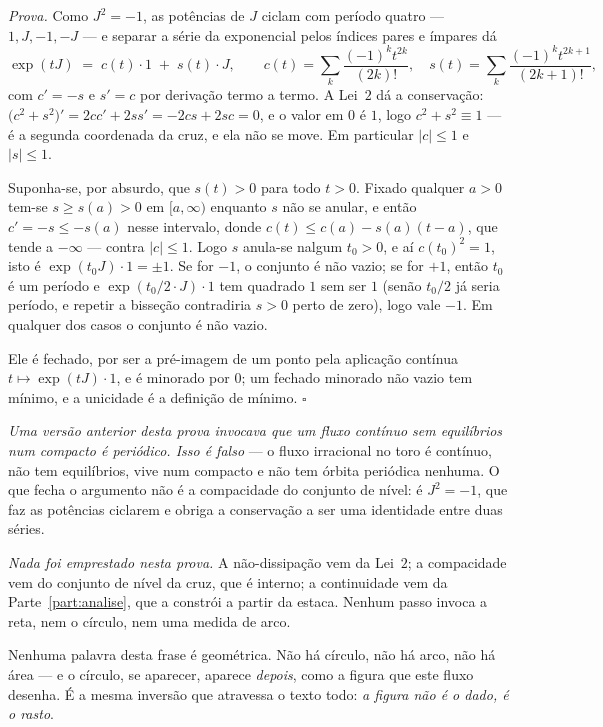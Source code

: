 \documentclass[livro.tex]{subfiles}
\begin{document}
\begin{mdframed}[linewidth=0.4pt,innerleftmargin=10pt,innerrightmargin=10pt,
                 innertopmargin=8pt,innerbottommargin=8pt,skipabove=6pt,skipbelow=6pt]
\smallskip
\emph{Prova.} Como $J^{2}=-1$, as potências de $J$ ciclam com período quatro --- $1,J,-1,-J$ ---
e separar a série da exponencial pelos índices pares e ímpares dá
\[
  \exp(tJ) \;=\; c(t)\cdot 1 \;+\; s(t)\cdot J,
  \qquad c(t)=\sum_{k}\frac{(-1)^{k}t^{2k}}{(2k)!},\quad
         s(t)=\sum_{k}\frac{(-1)^{k}t^{2k+1}}{(2k+1)!},
\]
com $c'=-s$ e $s'=c$ por derivação termo a termo. A Lei~$2$ dá a conservação: $\bigl(c^{2}+
s^{2}\bigr)'=2cc'+2ss'=-2cs+2sc=0$, e o valor em $0$ é $1$, logo $c^{2}+s^{2}\equiv1$ --- é a
segunda coordenada da cruz, e ela não se move. Em particular $|c|\leq1$ e $|s|\leq1$.

\smallskip
Suponha-se, por absurdo, que $s(t)>0$ para todo $t>0$. Fixado qualquer $a>0$ tem-se $s\geq s(a)>0$
em $[a,\infty)$ enquanto $s$ não se anular, e então $c'=-s\leq-s(a)$ nesse intervalo, donde
$c(t)\leq c(a)-s(a)(t-a)$, que tende a $-\infty$ --- contra $|c|\leq1$. Logo $s$ anula-se nalgum
$t_{0}>0$, e aí $c(t_{0})^{2}=1$, isto é $\exp(t_{0}J)\cdot1=\pm1$. Se for $-1$, o conjunto é não
vazio; se for $+1$, então $t_{0}$ é um período e $\exp(t_{0}/2\cdot J)\cdot1$ tem quadrado $1$ sem
ser $1$ (senão $t_{0}/2$ já seria período, e repetir a bisseção contradiria $s>0$ perto de zero),
logo vale $-1$. Em qualquer dos casos o conjunto é não vazio.

\smallskip
Ele é fechado, por ser a pré-imagem de um ponto pela aplicação contínua $t\mapsto\exp(tJ)\cdot1$,
e é minorado por $0$; um fechado minorado não vazio tem mínimo, e a unicidade é a definição de
mínimo. $\square$

\smallskip
\emph{Uma versão anterior desta prova invocava que um fluxo contínuo sem equilíbrios num compacto
é periódico. Isso é falso} --- o fluxo irracional no toro é contínuo, não tem equilíbrios, vive
num compacto e não tem órbita periódica nenhuma. O que fecha o argumento não é a compacidade do
conjunto de nível: é $J^{2}=-1$, que faz as potências ciclarem e obriga a conservação a ser uma
identidade entre duas séries.

\smallskip
\emph{Nada foi emprestado nesta prova.} A não-dissipação vem da Lei~$2$; a compacidade vem do
conjunto de nível da cruz, que é interno; a continuidade vem da Parte~\ref{part:analise}, que a
constrói a partir da estaca. Nenhum passo invoca a reta, nem o círculo, nem uma medida de arco.
\end{mdframed}

\noindent Nenhuma palavra desta frase é geométrica. Não há círculo, não há arco, não há área ---
e o círculo, se aparecer, aparece \emph{depois}, como a figura que este fluxo desenha. É a mesma
inversão que atravessa o texto todo: \emph{a figura não é o dado, é o rasto}.
\end{document}
